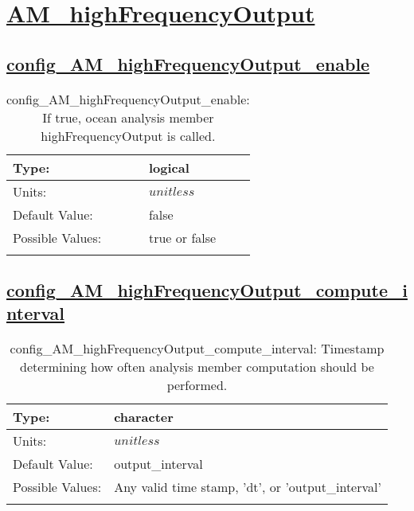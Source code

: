 \section[AM\_highFrequencyOutput]{\hyperref[sec:nm_tab_AM_highFrequencyOutput]{AM\_highFrequencyOutput}}
\label{sec:nm_sec_AM_highFrequencyOutput}
\subsection[config\_AM\_highFrequencyOutput\_enable]{\hyperref[sec:nm_tab_AM_highFrequencyOutput]{config\_AM\_highFrequencyOutput\_enable}}
\label{subsec:nm_sec_config_AM_highFrequencyOutput_enable}
\begin{center}
\begin{longtable}{| p{2.0in} || p{4.0in} |}
    \hline
    Type: & logical \\
    \hline
    Units: & $unitless$ \\
    \hline
    Default Value: & false \\
    \hline
    Possible Values: & true or false \\
    \hline
    \caption{config\_AM\_highFrequencyOutput\_enable: If true, ocean analysis member highFrequencyOutput is called.}
\end{longtable}
\end{center}
\subsection[config\_AM\_highFrequencyOutput\_compute\_interval]{\hyperref[sec:nm_tab_AM_highFrequencyOutput]{config\_AM\_highFrequencyOutput\_compute\_interval}}
\label{subsec:nm_sec_config_AM_highFrequencyOutput_compute_interval}
\begin{center}
\begin{longtable}{| p{2.0in} || p{4.0in} |}
    \hline
    Type: & character \\
    \hline
    Units: & $unitless$ \\
    \hline
    Default Value: & output\_interval \\
    \hline
    Possible Values: & Any valid time stamp, 'dt', or 'output\_interval' \\
    \hline
    \caption{config\_AM\_highFrequencyOutput\_compute\_interval: Timestamp determining how often analysis member computation should be performed.}
\end{longtable}
\end{center}
